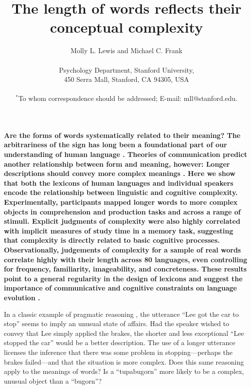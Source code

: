 \documentclass[12pt]{article}
\title{The length of words reflects their conceptual complexity}
\author
{Molly L. Lewis and Michael C. Frank\\
\\
\normalsize{Psychology Department, Stanford University,}\\
\normalsize{450 Serra Mall, Stanford, CA 94305, USA}\\
\\
\normalsize{$^\ast$To whom correspondence should be addressed; E-mail: mll@stanford.edu.}
}
\date{}
\newenvironment{sciabstract}{%
\begin{quote} \bf}
{\end{quote}}
\begin{document}
 

\baselineskip24pt

\maketitle 




{\bf Are the forms of words systematically related to their meaning? The arbitrariness of the sign has long been a foundational part of our understanding of human language \cite{saussure,hockett1960}. Theories of communication predict another relationship between form and meaning, however: Longer descriptions should convey more complex meanings \cite{horn1984,jaeger2006}. Here we show that both the lexicons of human languages and individual speakers encode the relationship between linguistic and cognitive complexity. Experimentally, participants mapped longer words to more complex objects in comprehension and production tasks and across a range of stimuli. Explicit judgments of complexity were also highly correlated with implicit measures of study time in a memory task, suggesting that complexity is directly related to basic cognitive processes. Observationally, judgements of complexity for a sample of real words correlate highly with their length across 80 languages, even controlling for frequency, familiarity, imageability, and concreteness. These results point to a general regularity in the design of lexicons and suggest the importance of communicative and cognitive constraints on language evolution \cite{christiansen2008,lieberman2007}.}


In a classic example of pragmatic reasoning \cite{horn1984}, the utterance ``Lee got the car to stop'' seems to imply an unusual state of affairs. Had the speaker wished to convey that Lee simply applied the brakes, the shorter and less exceptional ``Lee stopped the car'' would be a better description. The use of a longer utterance licenses the inference that there was some problem in stopping---perhaps the brakes failed---and that the situation is more complex. Does this same reasoning apply to the meanings of words? Is a ``tupabugorn'' more likely to be a complex, unusual object than a ``bugorn''? 
\end{document}
